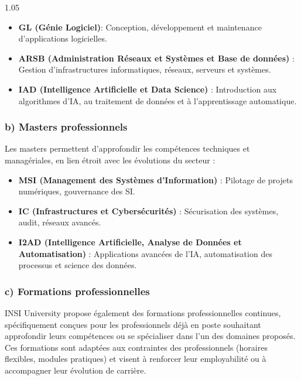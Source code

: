 \begin{spacing}{1.05} %

\begin{itemize}[noitemsep,nolistsep]
    \item \textbf{GL (Génie Logiciel)}: Conception, développement et maintenance d'applications logicielles.
    \item \textbf{ARSB (Administration Réseaux et Systèmes et Base de données)} : Gestion d'infrastructures informatiques, réseaux, serveurs et systèmes.
    \item \textbf{IAD (Intelligence Artificielle et Data Science)} : Introduction aux algorithmes d'IA, au traitement de données et à l'apprentissage automatique.
\end{itemize}

\subsubsection*{b) Masters professionnels}

Les masters permettent d'approfondir les compétences techniques et managériales, en lien étroit avec les évolutions du secteur :

\begin{itemize}[noitemsep,nolistsep]
    \item \textbf{MSI (Management des Systèmes d'Information)} : Pilotage de projets numériques, gouvernance des SI.
    \item \textbf{IC (Infrastructures et Cybersécurités)} : Sécurisation des systèmes, audit, réseaux avancés.
    \item \textbf{I2AD (Intelligence Artificielle, Analyse de Données et Automatisation)} : Applications avancées de l'IA, automatisation des processus et science des données.
\end{itemize}

\subsubsection*{c) Formations professionnelles}

INSI University propose également des formations professionnelles continues, spécifiquement conçues pour les professionnels déjà en poste souhaitant approfondir leurs compétences ou se spécialiser dans l'un des domaines proposés. Ces formations sont adaptées aux contraintes des professionnels (horaires flexibles, modules pratiques) et visent à renforcer leur employabilité ou à accompagner leur évolution de carrière.


\end{spacing}
